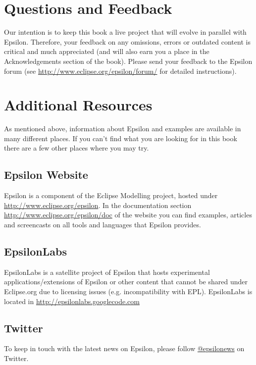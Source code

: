 \section{Questions and Feedback}

Our intention is to keep this book a live project that will evolve in parallel with Epsilon. Therefore, your feedback on any omissions, errors or outdated content is critical and much appreciated (and will also earn you a place in the Acknowledgements section of the book). Please send your feedback to the Epsilon forum  (see \url{http://www.eclipse.org/epsilon/forum/} for detailed instructions).

\section{Additional Resources}

As mentioned above, information about Epsilon and examples are available in many different places. If you can't find what you are looking for in this book there are a few other places where you may try.

\subsection{Epsilon Website}
Epsilon is a component of the Eclipse Modelling project, hosted under \url{http://www.eclipse.org/epsilon}. In the documentation section \url{http://www.eclipse.org/epsilon/doc} of the website you can find examples, articles and screencasts on all tools and languages that Epsilon provides.

\subsection{EpsilonLabs}

EpsilonLabs is a satellite project of Epsilon that hosts experimental applications/extensions of Epsilon or other content that cannot be shared under Eclipse.org due to licensing issues (e.g. incompatibility with EPL). EpsilonLabs is located in \url{http://epsilonlabs.googlecode.com}

\subsection{Twitter}
To keep in touch with the latest news on Epsilon, please follow \href{http://twitter.com/#!/epsilonews}{@epsilonews} on Twitter.